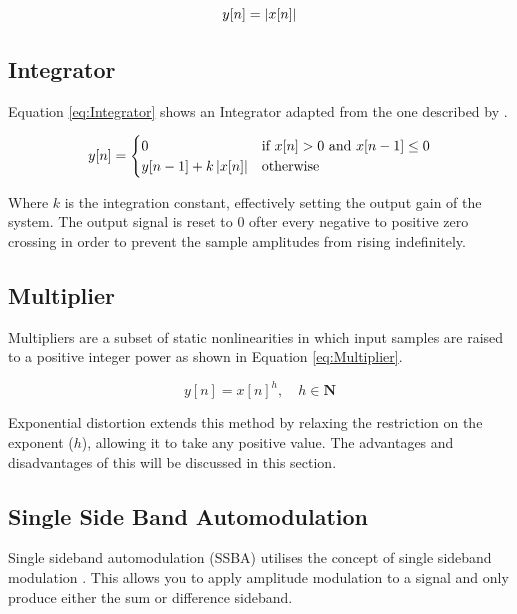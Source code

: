 		\begin{equation}
			y[n] = \left|x[n]\right|
			\label{eq:FullWaveRectification}
		\end{equation}

	\subsection{Integrator}
	\label{sec:Excitation-Methods-Integrator}
		Equation \ref{eq:Integrator} shows an Integrator adapted from the one described by \citet{larsen2004audio}.

		\begin{equation}
			y[n] = \begin{cases}
				0 & \text{if $x[n] > 0$ and $x[n - 1] \leq 0$} \\
				y[n - 1] + k\left|x[n]\right| & \text{otherwise}
			\end{cases}
			\label{eq:Integrator}
		\end{equation}

		Where $k$ is the integration constant, effectively setting the output gain of the system. The output signal
		is reset to 0 ofter every negative to positive zero crossing in order to prevent the sample amplitudes from
		rising indefinitely.

	\subsection{Multiplier}
	\label{sec:Excitation-Methods-Multiplier}
		Multipliers are a subset of static nonlinearities in which input samples are raised to a positive integer
		power as shown in Equation \ref{eq:Multiplier}.

		\begin{equation}
			y[n] = x[n]^{h}, \quad h \in \textbf{N}
			\label{eq:Multiplier}
		\end{equation}

		Exponential distortion extends this method by relaxing the restriction on the exponent ($h$), allowing it
		to take any positive value. The advantages and disadvantages of this will be discussed in this section.

	\subsection{Single Side Band Automodulation}
	\label{sec:Excitation-Methods-SSBA}
		Single sideband automodulation (SSBA) utilises the concept of single sideband modulation
		\citep{corinthios2009signals}. This allows you to apply amplitude modulation to a signal and only produce
		either the sum or difference sideband.

